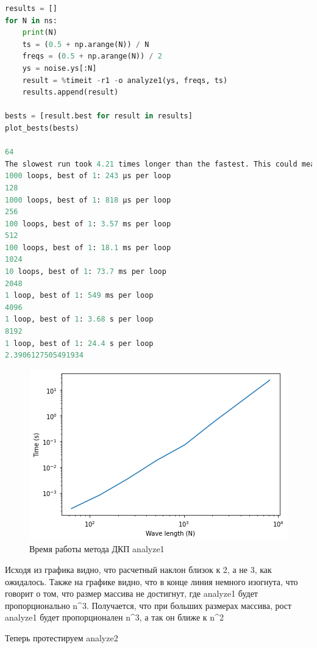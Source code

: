 \begin{lstlisting}[language=Python]
results = []
for N in ns:
    print(N)
    ts = (0.5 + np.arange(N)) / N
    freqs = (0.5 + np.arange(N)) / 2
    ys = noise.ys[:N]
    result = %timeit -r1 -o analyze1(ys, freqs, ts)
    results.append(result)

bests = [result.best for result in results]
plot_bests(bests)

64
The slowest run took 4.21 times longer than the fastest. This could mean that an intermediate result is being cached.
1000 loops, best of 1: 243 µs per loop
128
1000 loops, best of 1: 818 µs per loop
256
100 loops, best of 1: 3.57 ms per loop
512
100 loops, best of 1: 18.1 ms per loop
1024
10 loops, best of 1: 73.7 ms per loop
2048
1 loop, best of 1: 549 ms per loop
4096
1 loop, best of 1: 3.68 s per loop
8192
1 loop, best of 1: 24.4 s per loop
2.3906127505491934
\end{lstlisting}

\begin{figure}[H]
	\begin{center}
		\includegraphics[scale=1]{fig/lab06/lab06_01.png}
		\caption{Время работы метода ДКП analyze1}
	\end{center}
\end{figure}

Исходя из графика видно, что расчетный наклон близок к 2, а не 3, как ожидалось. Также на графике видно, что в конце линия немного изогнута, что говорит о том, что размер массива не достигнут, где analyze1 будет пропорционально n^3. Получается, что при больших размерах массива, рост analyze1 будет пропорционален n^3, а так он ближе к n^2

Теперь протестируем analyze2

